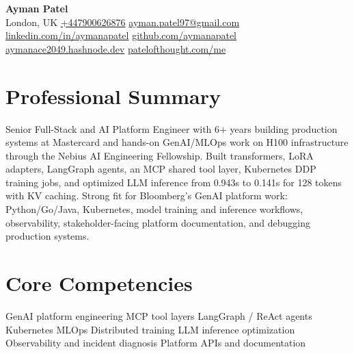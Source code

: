 \documentclass[10pt,a4paper]{article}
\begin{document}
\fontsize{8.55}{9.75}\selectfont

\begin{center}
{\Large \textbf{Ayman Patel}}\\[2pt]
London, UK \textbar{}
\href{tel:+447900626876}{+447900626876} \textbar{}
\href{mailto:ayman.patel97@gmail.com}{ayman.patel97@gmail.com} \textbar{}
\href{https://linkedin.com/in/aymanapatel}{linkedin.com/in/aymanapatel} \textbar{}
\href{https://github.com/aymanapatel}{github.com/aymanapatel} \textbar{}
\href{https://aymanace2049.hashnode.dev}{aymanace2049.hashnode.dev} \textbar{}
\href{https://patelofthought.com/me}{patelofthought.com/me}
\end{center}

\section*{Professional Summary}
Senior Full-Stack and AI Platform Engineer with 6+ years building production systems at Mastercard and hands-on GenAI/MLOps work on H100 infrastructure through the Nebius AI Engineering Fellowship. Built transformers, LoRA adapters, LangGraph agents, an MCP shared tool layer, Kubernetes DDP training jobs, and optimized LLM inference from 0.943s to 0.141s for 128 tokens with KV caching. Strong fit for Bloomberg's GenAI platform work: Python/Go/Java, Kubernetes, model training and inference workflows, observability, stakeholder-facing platform documentation, and debugging production systems.

\section*{Core Competencies}
GenAI platform engineering \textbar{} MCP tool layers \textbar{} LangGraph / ReAct agents \textbar{} Kubernetes MLOps \textbar{} Distributed training \textbar{} LLM inference optimization \textbar{} Observability and incident diagnosis \textbar{} Platform APIs and documentation
\end{document}
